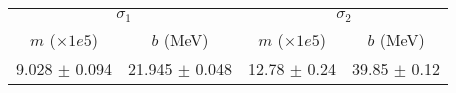 \begin{tabular}{cc|cc}
\multicolumn{2}{c|}{$\sigma_1$} & \multicolumn{2}{|c}{$\sigma_2$} \\
$m$ ($\times1e5$) & $b$ (MeV) & $m$ ($\times1e5$) & $b$ (MeV) \\
\hline
9.028 $\pm$ 0.094 & 21.945 $\pm$ 0.048 & 12.78 $\pm$ 0.24 & 39.85 $\pm$ 0.12\\
\end{tabular}

